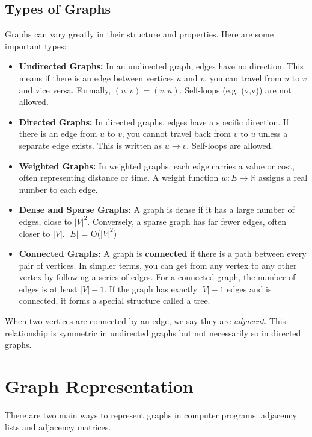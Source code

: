 \subsection{Types of Graphs}
Graphs can vary greatly in their structure and properties. Here are some important types:
\begin{itemize}
    \item \textbf{Undirected Graphs:} In an undirected graph, edges have no direction. This means if there is an edge between vertices $u$ and $v$, you can travel from $u$ to $v$ and vice versa. Formally, $(u, v) = (v, u)$. Self-loops (e.g. (v,v)) are not allowed.
    \item \textbf{Directed Graphs:} In directed graphs, edges have a specific direction. If there is an edge from $u$ to $v$, you cannot travel back from $v$ to $u$ unless a separate edge exists. This is written as $u \to v$. Self-loops are allowed.
    \item \textbf{Weighted Graphs:} In weighted graphs, each edge carries a value or cost, often representing distance or time. A weight function $w : E \to \mathbb{R}$ assigns a real number to each edge.
    \item \textbf{Dense and Sparse Graphs:} A graph is dense if it has a large number of edges, close to $|V|^2$. Conversely, a sparse graph has far fewer edges, often closer to $|V|$. $|E|$ = O($|V|^2$)
    \item \textbf{Connected Graphs:} A graph is \textbf{connected} if there is a path between every pair of vertices. In simpler terms, you can get from any vertex to any other vertex by following a series of edges. For a connected graph, the number of edges is at least $|V| - 1$. If the graph has exactly $|V| - 1$ edges and is connected, it forms a special structure called a tree.
\end{itemize}
When two vertices are connected by an edge, we say they are \textit{adjacent}. This relationship is symmetric in undirected graphs but not necessarily so in directed graphs.



\section{Graph Representation}
There are two main ways to represent graphs in computer programs: adjacency lists and adjacency matrices.

